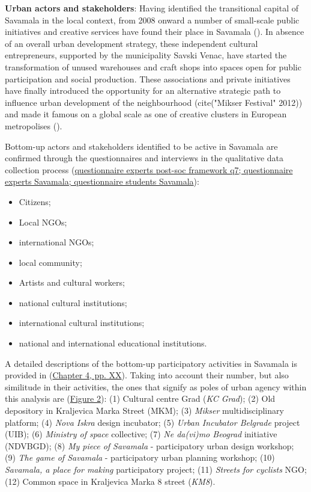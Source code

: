 \documentclass[11pt]{report}
\begin{document}
\begin{itemize}
\textbf{Urban actors and stakeholders}:
Having identified the transitional capital of Savamala in the local context, from 2008 onward a number of small-scale public initiatives and creative services have found their place in Savamala (\cite{(Cvetinovic et al. 2013)}).
In absence of an overall urban development strategy, these independent cultural entrepreneurs, supported by the municipality Savski Venac, have started the transformation of unused warehouses and craft shops into spaces open for public participation and social production.
These associations and private initiatives have finally introduced the opportunity for an alternative strategic path to influence urban development of the neighbourhood (cite{("Mikser Festival" 2012)}) and made it famous on a global scale as one of creative clusters in European metropolises (\cite{ref Monocle, Gardian?}).

Bottom-up actors and stakeholders identified to be active in Savamala are confirmed through the questionnaires and interviews in the qualitative data collection process (\href{}{questionnaire experts post-soc framework q7; questionnaire experts Savamala; questionnaire students Savamala}):
\begin{itemize}
\item Citizens;
\item Local NGOs;
\item international NGOs;
\item local community;
\item Artists and cultural workers;
\item national cultural institutions;
\item international cultural institutions;
\item national and international educational institutions.
\end{itemize}

A detailed descriptions of the bottom-up participatory activities in Savamala is provided in (\href{}{Chapter 4, pp. XX}).
Taking into account their number, but also similitude in their activities, the ones that signify as poles of urban agency within this analysis are (\href{}{Figure 2}): 
(1) Cultural centre Grad (\textit{KC Grad});
(2) Old depository in Kraljevica Marka Street (MKM);
(3) \textit{Mikser} multidisciplinary platform;
(4) \textit{Nova Iskra} design incubator;
(5) \textit{Urban Incubator Belgrade} project (UIB);
(6) \textit{Ministry of space} collective;
(7) \textit{Ne da(vi)mo Beograd} initiative (NDVBGD);
(8) \textit{My piece of Savamala} - participatory urban design workshop;
(9) \textit{The game of Savamala} - participatory urban planning workshop;
(10) \textit{Savamala, a place for making} participatory project;
(11) \textit{Streets for cyclists} NGO;
(12) Common space in Kraljevica Marka 8 street (\textit{KM8}).
\\


\end{itemize}
\end{document}
